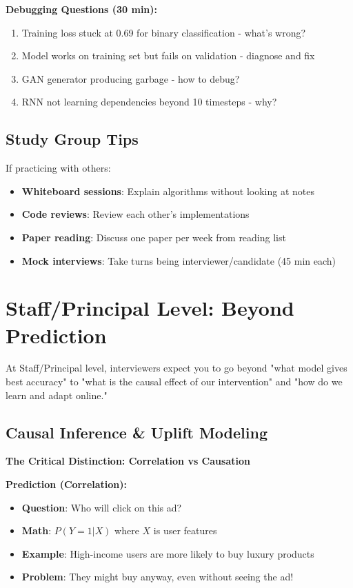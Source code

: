 \documentclass[10pt]{article}
\begin{document}
\textbf{Debugging Questions (30 min):}
\begin{enumerate}
\item Training loss stuck at 0.69 for binary classification - what's wrong?
\item Model works on training set but fails on validation - diagnose and fix
\item GAN generator producing garbage - how to debug?
\item RNN not learning dependencies beyond 10 timesteps - why?
\end{enumerate}

\subsection{Study Group Tips}

If practicing with others:
\begin{itemize}
\item \textbf{Whiteboard sessions}: Explain algorithms without looking at notes
\item \textbf{Code reviews}: Review each other's implementations
\item \textbf{Paper reading}: Discuss one paper per week from reading list
\item \textbf{Mock interviews}: Take turns being interviewer/candidate (45 min each)
\end{itemize}

\section{Staff/Principal Level: Beyond Prediction}

At Staff/Principal level, interviewers expect you to go beyond "what model gives best accuracy" to "what is the causal effect of our intervention" and "how do we learn and adapt online."

\subsection{Causal Inference \& Uplift Modeling}

\textbf{The Critical Distinction: Correlation vs Causation}

\textbf{Prediction (Correlation):}
\begin{itemize}
\item \textbf{Question}: Who will click on this ad?
\item \textbf{Math}: $P(Y = 1 | X)$ where $X$ is user features
\item \textbf{Example}: High-income users are more likely to buy luxury products
\item \textbf{Problem}: They might buy anyway, even without seeing the ad!
\end{itemize}
\end{document}

